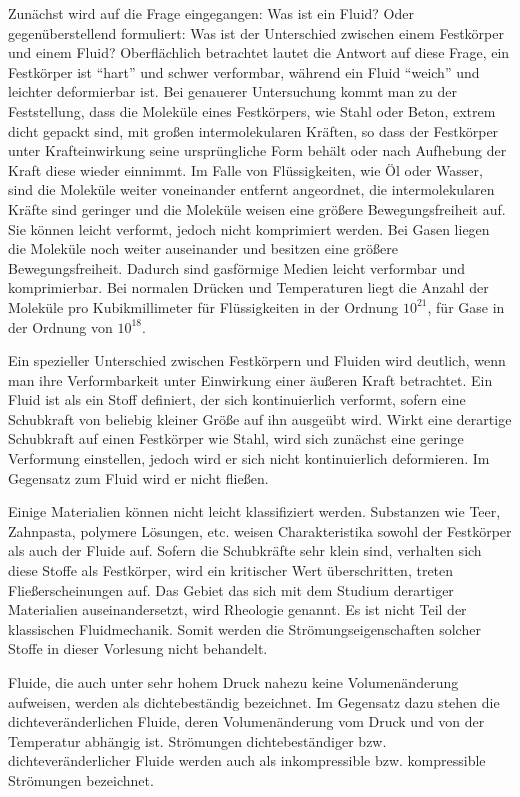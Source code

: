 \documentclass{lecture}
\begin{document}
    Zunächst wird auf die Frage eingegangen: Was ist ein Fluid?
    Oder gegenüberstellend formuliert: Was ist der Unterschied zwischen einem Festkörper und einem Fluid?
    Oberflächlich betrachtet lautet die Antwort auf diese Frage, ein Festkörper ist ``hart'' und schwer verformbar, während ein Fluid ``weich'' und leichter deformierbar ist.
    Bei genauerer Untersuchung kommt man zu der Feststellung, dass die Moleküle eines Festkörpers, wie Stahl oder Beton, extrem dicht gepackt sind, mit großen intermolekularen Kräften, so dass der Festkörper unter Krafteinwirkung seine ursprüngliche Form behält oder nach Aufhebung der Kraft diese wieder einnimmt.
    Im Falle von Flüssigkeiten, wie Öl oder Wasser, sind die Moleküle weiter voneinander entfernt angeordnet, die intermolekularen Kräfte sind geringer und die Moleküle weisen eine größere Bewegungsfreiheit auf.
    Sie können leicht verformt, jedoch nicht komprimiert werden.
    Bei Gasen liegen die Moleküle noch weiter auseinander und besitzen eine größere Bewegungsfreiheit.
    Dadurch sind gasförmige Medien leicht verformbar und komprimierbar.
    Bei normalen Drücken und Temperaturen liegt die Anzahl der Moleküle pro Kubikmillimeter für Flüssigkeiten in der Ordnung \(10^{21}\), für Gase in der Ordnung von \(10^{18}\).

    Ein spezieller Unterschied zwischen Festkörpern und Fluiden wird deutlich, wenn man ihre Verformbarkeit unter Einwirkung einer äußeren Kraft betrachtet.
    Ein Fluid ist als ein Stoff definiert, der sich kontinuierlich verformt, sofern eine Schubkraft von beliebig kleiner Größe auf ihn ausgeübt wird.
    Wirkt eine derartige Schubkraft auf einen Festkörper wie Stahl, wird sich zunächst eine geringe Verformung einstellen, jedoch wird er sich nicht kontinuierlich deformieren.
    Im Gegensatz zum Fluid wird er nicht fließen.

    Einige Materialien können nicht leicht klassifiziert werden.
    Substanzen wie Teer, Zahnpasta, polymere Lösungen, etc. weisen Charakteristika sowohl der Festkörper als auch der Fluide auf.
    Sofern die Schubkräfte sehr klein sind, verhalten sich diese Stoffe als Festkörper, wird ein kritischer Wert überschritten, treten Fließerscheinungen auf.
    Das Gebiet das sich mit dem Studium derartiger Materialien auseinandersetzt, wird Rheologie genannt.
    Es ist nicht Teil der klassischen Fluidmechanik.
    Somit werden die Strömungseigenschaften solcher Stoffe in dieser Vorlesung nicht behandelt.

    Fluide, die auch unter sehr hohem Druck nahezu keine Volumenänderung aufweisen, werden als dichtebeständig bezeichnet.
    Im Gegensatz dazu stehen die dichteveränderlichen Fluide, deren Volumenänderung vom Druck und von der Temperatur abhängig ist.
    Strömungen dichtebeständiger bzw. dichteveränderlicher Fluide werden auch als inkompressible bzw. kompressible Strömungen bezeichnet.
\end{document}
